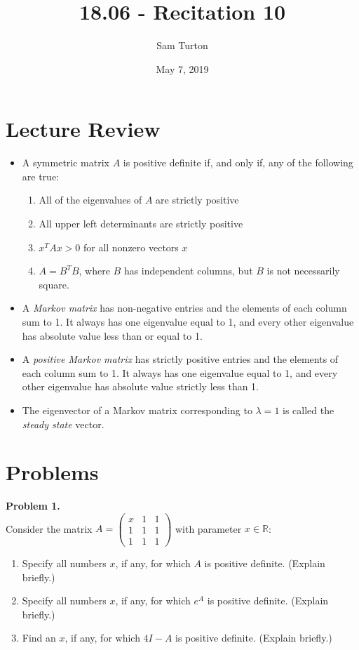 \documentclass[11pt]{article}
\title{18.06 - Recitation 10}
\author{Sam Turton}
\date{May 7, 2019}
\begin{document}
\maketitle

\section{Lecture Review}
\begin{itemize}
\item A symmetric matrix $A$ is positive definite if, and only if, any of the following are true:
\begin{enumerate}
\item All of the eigenvalues of $A$ are strictly positive
\item All upper left determinants are strictly positive
\item $x^TAx > 0 $ for all nonzero vectors $x$
\item $A = B^TB$, where $B$ has independent columns, but $B$ is not necessarily square.   
\end{enumerate}
\item A \emph{Markov matrix} has non-negative entries and the elements of each column sum to 1. It always has one eigenvalue equal to 1, and every other eigenvalue has absolute value less than or equal to 1.
\item A \emph{positive Markov matrix} has strictly positive entries and the elements of each column sum to 1. It always has one eigenvalue equal to 1, and every other eigenvalue has absolute value strictly less than 1.
\item The eigenvector of a Markov matrix corresponding to $\lambda = 1$ is called the \emph{steady state} vector.
\end{itemize}

\section{Problems}
\noindent \textbf{Problem 1.}\\
Consider the matrix $A = \begin{pmatrix} x & 1 & 1 \\ 1 & 1 & 1 \\ 1 & 1 & 1 \end{pmatrix}$ with parameter $x\in\mathbb{R}$:
\begin{enumerate}
\item Specify all numbers $x$, if any, for which $A$ is positive definite. (Explain briefly.)
\item Specify all numbers $x$, if any, for which $e^A$ is positive definite. (Explain briefly.)
\item Find an $x$, if any, for which $4I - A$ is positive definite. (Explain briefly.)
\end{enumerate}
\end{document}
